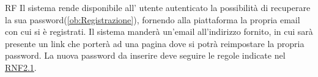 \begin{listaPersonale}{RF}
	Il sistema rende disponibile all' utente autenticato la possibilità di recuperare la sua password(\ref{ob:Registrazione}), fornendo alla piattaforma la propria email con cui si è registrati. Il sistema manderà un'email all'indirizzo fornito, in cui sarà presente un link che porterà ad una pagina dove si potrà reimpostare la propria password. La nuova password da inserire deve seguire le regole indicate nel  \hyperref[rnf:SicurezzaPassword]{RNF2.1}. %
\end{listaPersonale}